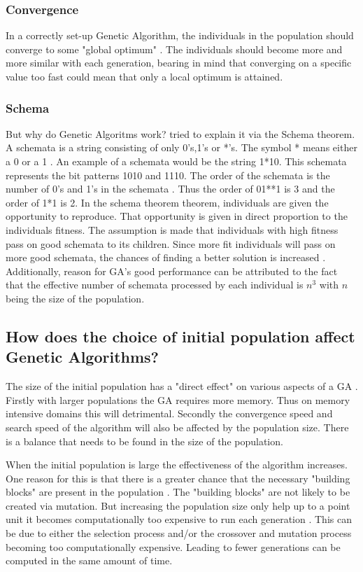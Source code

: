 \documentclass[12pt,a4paper]{report}
\begin{document}
\subsubsection{Convergence}

In a correctly set-up Genetic Algorithm, the individuals in the population should converge to some "global optimum" \citep{beasley}. The individuals should become more and more similar with each generation, bearing in mind that converging on a specific value too fast could mean that only a local optimum is attained.

\subsubsection{Schema}
But why do Genetic Algoritms work? \cite{holland} tried to explain it via the Schema theorem. A schemata is a string consisting of only 0's,1's or *'s. The symbol * means either a 0 or a 1 \citep{michell}. An example of a schemata would be the string 1*10. This schemata represents the bit patterns 1010 and 1110. The order of the schemata is the number of 0's and 1's in the schemata \citep{beasley}. Thus the order of 01**1 is 3 and the order of 1*1 is 2. In the schema theorem theorem, individuals are given the opportunity to reproduce. That opportunity is given in direct proportion to the individuals fitness. The assumption is made that individuals with high fitness pass on good schemata to its children. Since more fit individuals will pass on more good schemata, the chances of finding a better solution is increased \citep{beasley}. Additionally, \cite{holland} reason for GA's good performance can be attributed to the fact that the effective number of schemata processed by each individual is $n^3$ with $n$ being the size of the population. 

\subsection{How does the choice of initial population affect Genetic Algorithms?}
The size of the initial population has a "direct effect" on various aspects of a GA \citep{gupta}. Firstly with larger populations the GA requires more memory. Thus on memory intensive domains this will detrimental. Secondly the convergence speed and search speed of the algorithm will also be affected by the population size. There is a balance that needs to be found in the size of the population. 

When the initial population is large the effectiveness of the algorithm increases. One reason for this is that there is a greater chance that the necessary "building blocks" are present in the population \citep{harik}. The "building blocks" are not likely to be created via mutation. But increasing the population size only help up to a point unit it becomes computationally too expensive to run each generation \citep{gupta}. This can be due to either the selection process and/or the crossover and mutation process becoming too computationally expensive. Leading to fewer generations can be computed in the same amount of time. 
\end{document}
